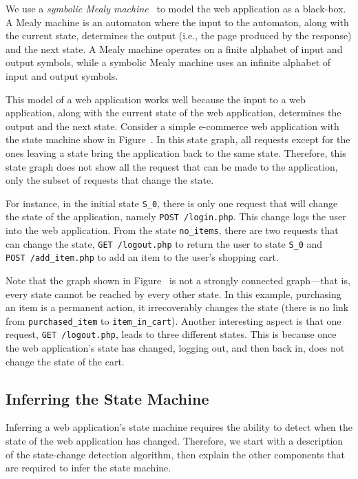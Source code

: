 

We use a \emph{symbolic Mealy machine}~\cite{berg08} to model the web
application as a black-box. A Mealy machine is an automaton where the input to
the automaton, along with the current state, determines the output (i.e., the
page produced by the response) and the next state. A Mealy machine operates on a
finite alphabet of input and output symbols, while a symbolic Mealy machine uses
an infinite alphabet of input and output symbols.

This model of a web application works well because the input to a web
application, along with the current state of the web application, determines
the output and the next state. Consider a simple e-commerce web application
with the state machine show in Figure~. In this
state graph, all requests except for the ones leaving a state bring the
application back to the same state. Therefore, this state graph does not show
all the request that can be made to the application, only the subset of
requests that change the state.

For instance, in the initial state \texttt{S\_0}, there is only one request that
will change the state of the application, namely \texttt{POST~/login.php}. This
change logs the user into the web application. From the state
\texttt{no\_items}, there are two requests that can change the state,
\texttt{GET~/logout.php} to return the user to state \texttt{S\_0} and
\texttt{POST~/add\_item.php} to add an item to the user's shopping cart.

Note that the graph shown in Figure~ is not a
strongly connected graph---that is, every state cannot be reached by every
other state. In this example, purchasing an item is a permanent action, it
irrecoverably changes the state (there is no link from
\texttt{purchased\_item} to \texttt{item\_in\_cart}). Another interesting
aspect is that one request, \texttt{GET~/logout.php}, leads to three different
states. This is because once the web application's state has changed, 
logging out, and then back in, does not change the state of the cart.

\subsection{Inferring the State Machine}

Inferring a web application's state machine requires the ability to detect when
the state of the web application has changed. Therefore, we start with a
description of the state-change detection algorithm, then explain the other
components that are required to infer the state machine. 

